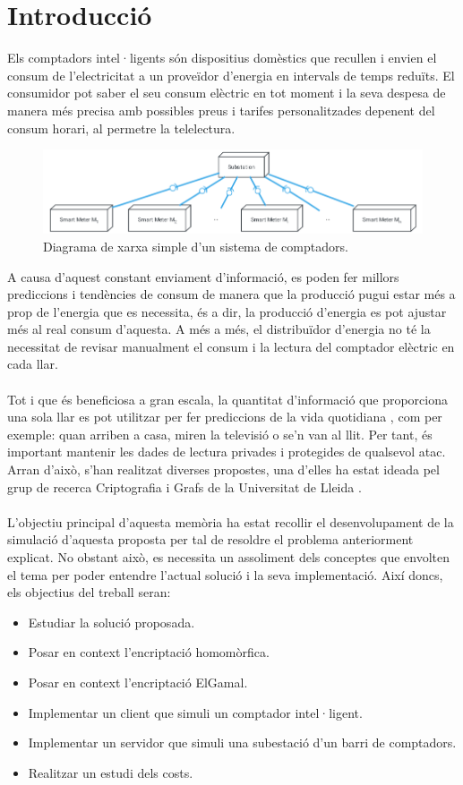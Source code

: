\documentclass{article}
\begin{document}
\part{Introducció}
Els comptadors intel·ligents són dispositius domèstics que recullen i envien 
el consum de l'electricitat a un proveïdor d’energia en intervals de temps reduïts. El consumidor pot saber el seu consum elèctric en tot moment i la seva despesa de manera més precisa amb possibles preus i tarifes personalitzades depenent del consum horari, al permetre la telelectura.
\begin{figure}[H]
	\includegraphics[width=15cm]{umls/network.png}
	\caption{Diagrama de xarxa simple d'un sistema de comptadors.}
\end{figure}
A causa d'aquest constant enviament d'informació,
es poden fer millors prediccions i tendències de consum de manera que la producció pugui estar més a prop de l'energia que es necessita, és a dir, la producció d'energia es pot ajustar més al real consum d'aquesta. A més a més, el distribuïdor d'energia no té la necessitat de revisar manualment el consum i la lectura del comptador elèctric en cada llar.
\\
\\
Tot i que és beneficiosa a gran escala, la quantitat d'informació que proporciona una sola llar es pot utilitzar per fer prediccions de la vida quotidiana \cite{smart-grid-overview}, com per exemple: quan arriben a casa, miren la televisió o se'n van al llit. Per tant, és important mantenir les dades de lectura privades i protegides de qualsevol atac. Arran d'això, s'han realitzat diverses propostes, una d'elles ha estat ideada pel grup de recerca Criptografia i Grafs de la Universitat de Lleida \cite{recsi}.
\\\\
L'objectiu principal d'aquesta memòria ha estat recollir el desenvolupament de la simulació d'aquesta proposta per tal de resoldre el problema anteriorment explicat. No obstant això, es necessita un assoliment dels conceptes que envolten el tema per poder entendre l'actual solució i la seva implementació. Així doncs, els objectius del treball seran:
\begin{itemize}
	\item Estudiar la solució proposada.
	\item Posar en context l'encriptació homomòrfica.
	\item Posar en context l'encriptació ElGamal.
	\item Implementar un client que simuli un comptador intel·ligent.
	\item Implementar un servidor que simuli una subestació d'un barri de comptadors.
	\item Realitzar un estudi dels costs.
\end{itemize}
\end{document}
